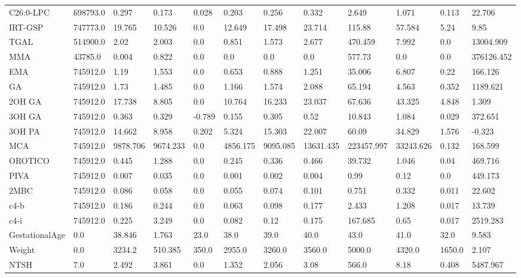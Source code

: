 \begin{tabular}{llllllllllll}
C26:0-LPC & 698793.0 & 0.297 & 0.173 & 0.028 & 0.203 & 0.256 & 0.332 & 2.649 & 1.071 & 0.113 & 22.706 \\
IRT-GSP & 747773.0 & 19.765 & 10.526 & 0.0 & 12.649 & 17.498 & 23.714 & 115.88 & 57.584 & 5.24 & 9.85 \\
TGAL & 514900.0 & 2.02 & 2.003 & 0.0 & 0.851 & 1.573 & 2.677 & 470.459 & 7.992 & 0.0 & 13004.909 \\
MMA & 43785.0 & 0.004 & 0.822 & 0.0 & 0.0 & 0.0 & 0.0 & 577.73 & 0.0 & 0.0 & 376126.452 \\
EMA & 745912.0 & 1.19 & 1.553 & 0.0 & 0.653 & 0.888 & 1.251 & 35.006 & 6.807 & 0.22 & 166.126 \\
GA & 745912.0 & 1.73 & 1.485 & 0.0 & 1.166 & 1.574 & 2.088 & 65.194 & 4.563 & 0.352 & 1189.621 \\
2OH GA & 745912.0 & 17.738 & 8.805 & 0.0 & 10.764 & 16.233 & 23.037 & 67.636 & 43.325 & 4.848 & 1.309 \\
3OH GA & 745912.0 & 0.363 & 0.329 & -0.789 & 0.155 & 0.305 & 0.52 & 10.843 & 1.084 & 0.029 & 372.651 \\
3OH PA & 745912.0 & 14.662 & 8.958 & 0.202 & 5.324 & 15.303 & 22.007 & 60.09 & 34.829 & 1.576 & -0.323 \\
MCA & 745912.0 & 9878.706 & 9674.233 & 0.0 & 4856.175 & 9095.085 & 13631.435 & 223457.997 & 33243.626 & 0.132 & 168.599 \\
OROTICO & 745912.0 & 0.445 & 1.288 & 0.0 & 0.245 & 0.336 & 0.466 & 39.732 & 1.046 & 0.04 & 469.716 \\
PIVA & 745912.0 & 0.007 & 0.035 & 0.0 & 0.001 & 0.002 & 0.004 & 0.99 & 0.12 & 0.0 & 449.173 \\
2MBC & 745912.0 & 0.086 & 0.058 & 0.0 & 0.055 & 0.074 & 0.101 & 0.751 & 0.332 & 0.011 & 22.602 \\
c4-b & 745912.0 & 0.186 & 0.244 & 0.0 & 0.063 & 0.098 & 0.177 & 2.433 & 1.208 & 0.017 & 13.739 \\
c4-i & 745912.0 & 0.225 & 3.249 & 0.0 & 0.082 & 0.12 & 0.175 & 167.685 & 0.65 & 0.017 & 2519.283 \\
GestationalAge & 0.0 & 38.846 & 1.763 & 23.0 & 38.0 & 39.0 & 40.0 & 43.0 & 41.0 & 32.0 & 9.583 \\
Weight & 0.0 & 3234.2 & 510.385 & 350.0 & 2955.0 & 3260.0 & 3560.0 & 5000.0 & 4320.0 & 1650.0 & 2.107 \\
NTSH & 7.0 & 2.492 & 3.861 & 0.0 & 1.352 & 2.056 & 3.08 & 566.0 & 8.18 & 0.408 & 5487.967 \\
\bottomrule
\end{tabular}
